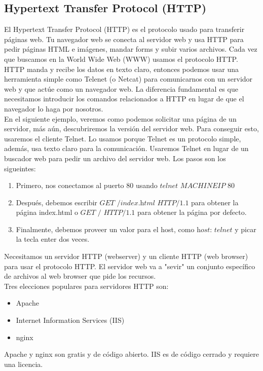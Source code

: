 \documentclass[12pt]{report}
\begin{document}
\subsection{Hypertext Transfer Protocol (HTTP) }
El Hypertext Transfer Protocol (HTTP) es el protocolo usado
para transferir páginas web. Tu navegador web se conecta 
al servidor web y usa HTTP para pedir páginas HTML e imágenes, 
mandar forms y subir varios archivos. 
Cada vez que buscamos en la World Wide Web (WWW) usamos el protocolo
HTTP.\\
HTTP manda y recibe los datos en texto claro, entonces podemos
usar una herramienta simple como Telenet (o Netcat) para 
comunicarnos con un servidor web y que actúe como un 
navegador web. La diferencia fundamental es que necesitamos
introducir los comandos relacionados a HTTP en lugar de que el 
navegador lo haga por nosotros.\\
En el siguiente ejemplo, veremos como podemos solicitar una página
de un servidor, más aún, descubriremos la versión del servidor web.
Para conseguir esto, usaremos el cliente Telnet. Lo usamos
porque Telnet es un protocolo simple, además, usa texto claro 
para la comunicación. Usaremos Telnet en lugar de un buscador web 
para pedir un archivo del servidor web. Los pasos son los sigueintes:
\begin{enumerate}
  \item Primero, nos conectamos al puerto 80 usando $\textit{telnet MACHINEIP 80}$
  \item Después, debemos escribir $\textit{GET /index.html HTTP/1.1}$ para 
    obtener la página index.html o $\textit{GET / HTTP/1.1}$ para 
    obtener la página por defecto.
  \item Finalmente, debemos proveer un valor para el host, como $\textit{host: telnet}$ 
    y picar la tecla enter dos veces.
\end{enumerate}
Necesitamos un servidor HTTP (webserver) y un cliente HTTP (web browser)
para usar el protocolo HTTP. El servidor web va a "sevir" un conjunto 
específico de archivos al web browser que pide los recursos.\\
Tres elecciones populares para servidores HTTP son:
\begin{itemize}
  \item Apache
  \item Internet Information Services (IIS)
  \item nginx
\end{itemize}
Apache y nginx son gratis y de código abierto. IIS es de código cerrado
y requiere una licencia.\\
\end{document}
